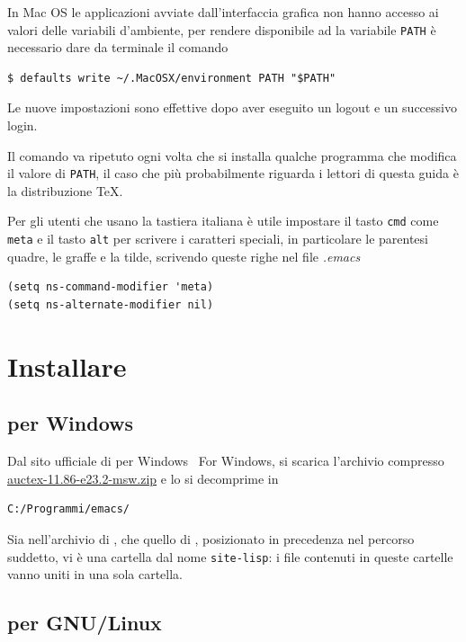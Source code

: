 \documentclass[11pt,a4paper]{article}
\begin{document}
In Mac OS le applicazioni avviate dall'interfaccia grafica non hanno
accesso ai valori delle variabili d'ambiente, per rendere disponibile
ad \emacs{} la variabile \texttt{PATH} è necessario dare da terminale
il comando
\begin{Verbatim}
$ defaults write ~/.MacOSX/environment PATH "$PATH"
\end{Verbatim}
Le nuove impostazioni sono effettive dopo aver eseguito un logout e un
successivo login.

Il comando va ripetuto ogni volta che si installa qualche programma
che modifica il valore di \texttt{PATH}, il caso che più probabilmente
riguarda i lettori di questa guida è la distribuzione \TeX{}.

Per gli utenti che usano la tastiera italiana è utile impostare il
tasto \texttt{cmd} come \texttt{meta} e il tasto \texttt{alt} per
scrivere i caratteri speciali, in particolare le parentesi quadre, le
graffe e la tilde, scrivendo queste righe nel file \emph{.emacs}
\begin{Verbatim}
(setq ns-command-modifier 'meta)
(setq ns-alternate-modifier nil)
\end{Verbatim}

\section{Installare \auctex}
\label{sec:installauc}

\subsection{\auctex{} per Windows}
\label{sec:auctexwin}

Dal sito ufficiale di \auctex{} per Windows %
%
{\auctex\ For Windows}, %
si scarica l'archivio compresso %
\href{http://ftp.gnu.org/pub/gnu/auctex/auctex-11.86-e23.2-msw.zip}%
{\textsf{auctex-11.86-e23.2-msw.zip}} e lo si decomprime in
\begin{Verbatim}
C:/Programmi/emacs/
\end{Verbatim}
Sia nell'archivio di \auctex{}, che quello di \emacs, posizionato in
precedenza nel percorso suddetto, vi è una cartella dal nome
\texttt{site-lisp}: i file contenuti in queste cartelle vanno uniti in
una sola cartella.

\subsection{\auctex{} per GNU/Linux}
\label{sec:auctexlinux}
\end{document}

